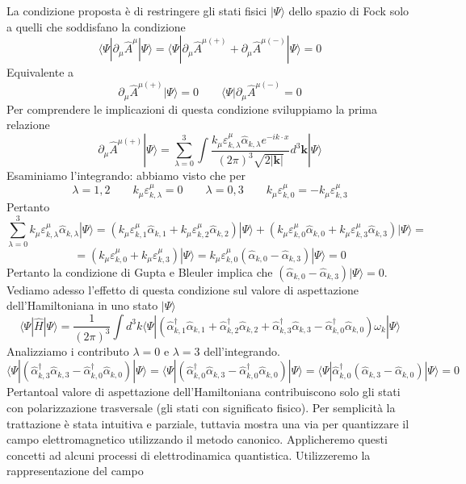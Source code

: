 La condizione proposta è di restringere gli stati fisici $|\Psi\rangle$ dello spazio di Fock solo a quelli che soddisfano la condizione
$$
\langle \Psi | \partial_\mu \hat{A}^\mu | \Psi \rangle = \langle \Psi | \partial_\mu \hat{A}^{\mu(+)} + \partial_\mu \hat{A}^{\mu(-)} | \Psi \rangle = 0
$$
Equivalente a 
$$
\partial_\mu \hat{A}^{\mu(+)} | \Psi \rangle = 0 \qquad \langle \Psi | \partial_\mu \hat{A}^{\mu(-)} = 0
$$
Per comprendere le implicazioni di questa condizione sviluppiamo la prima relazione
$$
\partial_\mu \hat{A}^{\mu(+)} | \Psi \rangle = \sum_{\lambda=0}^3 \int \frac{k_\mu \varepsilon^\mu_{k,\lambda} \hat{\alpha}_{k,\lambda} e^{-ik\cdot x}}{(2\pi)^3 \sqrt{2|\mathbf{k}|}} d^3\mathbf{k} | \Psi \rangle
$$
Esaminiamo l'integrando: abbiamo visto che per 
$$
\lambda=1,2 \qquad k_\mu \varepsilon^\mu_{k,\lambda} = 0 \qquad \lambda=0,3 \qquad k_\mu \varepsilon^\mu_{k,0} = -k_\mu \varepsilon^\mu_{k,3}
$$
Pertanto 
$$
\sum_{\lambda=0}^3 k_\mu \varepsilon^\mu_{k,\lambda} \hat{\alpha}_{k,\lambda} |\Psi\rangle = (k_\mu \varepsilon^\mu_{k,1} \hat{\alpha}_{k,1} + k_\mu \varepsilon^\mu_{k,2} \hat{\alpha}_{k,2}) |\Psi\rangle + (k_\mu \varepsilon^\mu_{k,0} \hat{\alpha}_{k,0} + k_\mu \varepsilon^\mu_{k,3} \hat{\alpha}_{k,3}) |\Psi\rangle =
$$
$$
= (k_\mu \varepsilon^\mu_{k,0} + k_\mu \varepsilon^\mu_{k,3}) |\Psi\rangle = k_\mu \varepsilon^\mu_{k,0} (\hat{\alpha}_{k,0} - \hat{\alpha}_{k,3}) |\Psi\rangle = 0
$$
Pertanto la condizione di Gupta e Bleuler implica che $(\hat{\alpha}_{k,0} - \hat{\alpha}_{k,3}) |\Psi\rangle = 0$. Vediamo adesso l'effetto di questa condizione sul valore di aspettazione dell'Hamiltoniana in uno stato $|\Psi\rangle$
$$
\langle \Psi | \hat{H} | \Psi \rangle = \frac{1}{(2\pi)^3} \int d^3k \langle \Psi | (\hat{\alpha}_{k,1}^\dagger \hat{\alpha}_{k,1} + \hat{\alpha}_{k,2}^\dagger \hat{\alpha}_{k,2} + \hat{\alpha}_{k,3}^\dagger \hat{\alpha}_{k,3} - \hat{\alpha}_{k,0}^\dagger \hat{\alpha}_{k,0}) \omega_k | \Psi \rangle
$$
Analizziamo i contributo $\lambda=0$ e $\lambda=3$ dell'integrando.
$$
\langle \Psi | (\hat{\alpha}_{k,3}^\dagger \hat{\alpha}_{k,3} - \hat{\alpha}_{k,0}^\dagger \hat{\alpha}_{k,0}) | \Psi \rangle = \langle \Psi | (\hat{\alpha}_{k,0}^\dagger \hat{\alpha}_{k,3} - \hat{\alpha}_{k,0}^\dagger \hat{\alpha}_{k,0}) | \Psi \rangle = \langle \Psi | \hat{\alpha}_{k,0}^\dagger (\hat{\alpha}_{k,3} - \hat{\alpha}_{k,0}) | \Psi \rangle = 0
$$
Pertantoal valore di aspettazione dell'Hamiltoniana contribuiscono solo gli stati con polarizzazione trasversale (gli stati con significato fisico). Per semplicità la trattazione è stata intuitiva e parziale, tuttavia mostra una via per quantizzare il campo elettromagnetico utilizzando il metodo canonico. Applicheremo questi concetti ad alcuni processi di elettrodinamica quantistica. Utilizzeremo la rappresentazione del campo
